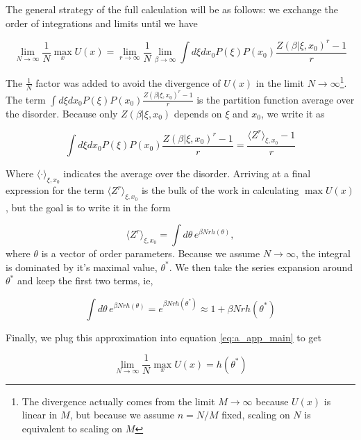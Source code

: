 The general strategy of the full calculation will be as follows: we
exchange the order of integrations and limits until we have

\begin{equation}
    \label{eq:a_app_main}
    \lim_{N\to\infty} \frac{1}{N}\max_x U(x) =
    \lim_{r\to\infty} \frac{1}{N}\lim_{\beta\to\infty} \int d\xi dx_0 P(\xi) P(x_0)
    \frac{Z(\beta | \xi, x_0)^r - 1}{r}
\end{equation}
 
The $\frac{1}{N}$ factor was added to avoid the divergence of $U(x)$
in the limit $N\to\infty$\footnote{The divergence actually comes from
  the limit $M\to\infty$ because $U(x)$ is linear in $M$, but because
  we assume $n = N/M$ fixed, scaling on $N$ is equivalent to scaling
  on $M$}. The term $\int d\xi dx_0 P(\xi) P(x_0)
\frac{Z(\beta | \xi, x_0)^r - 1}{r}$ is the partition function
average over the disorder. Because only $Z(\beta | \xi, x_0)$
depends on $\xi$ and $x_0$, we write it as

    \begin{equation}
      \label{eq:a_2}
      \int d\xi dx_0 P(\xi) P(x_0) \frac{Z(\beta | \xi, x_0)^r - 1}{r}
      = \frac{\langle Z^r \rangle_{\xi, x_0} - 1}{r}
    \end{equation}

Where $\langle \cdot \rangle_{\xi, x_0}$ indicates the average
over the disorder. Arriving at a final expression for the term
$\langle Z^r \rangle_{\xi, x_0}$ is the bulk of the work in
calculating $\max U(x)$, but the goal is to write it in the form

\begin{equation}
  \label{eq:a_3}
  \langle Z^r \rangle_{\xi, x_0} = \int d\theta \, e^{\beta N r h(\theta)},
\end{equation}
where $\theta$ is a vector of order parameters. Because we assume
$N\to \infty$, the integral is dominated by it's maximal value, $\theta^\ast$. We
then take the series expansion around $\theta^\ast$ and keep the first
two terms, ie,

\begin{equation}
  \label{eq:a_4}
  \int d\theta  \, e^{\beta N r h(\theta)}  =  e^{\beta N r
    h(\theta^\ast)} \approx 1 + \beta N r h(\theta^\ast)
\end{equation}

Finally, we plug this approximation into equation \eqref{eq:a_app_main}
to get

\begin{equation}
    \label{eq:a_app_main}
    \lim_{N\to\infty} \frac{1}{N}\max_x U(x) =
    h(\theta^\ast)
\end{equation}

